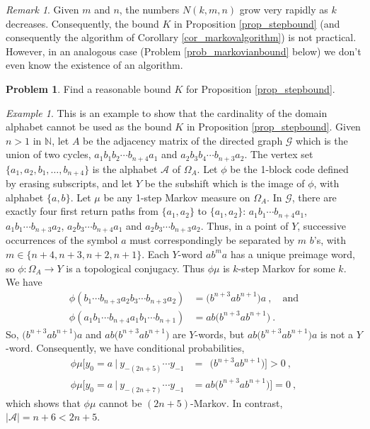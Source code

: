 \documentclass{kepart2010}
\theoremstyle{plain}
\theoremstyle{definition}
\newtheorem{prob}[thm]{Problem}
\theoremstyle{remark}
\newtheorem{rem}[thm]{Remark}        \newtheorem{ex}[thm]{Example}
\theoremstyle{definition}
\numberwithin{equation}{section}
\begin{document}
\begin{rem} Given $m$ and $n$, the numbers $N(k,m,n)$
grow very  rapidly as $k$ decreases.
Consequently, the
 bound $K$ in Proposition \ref{prop_stepbound}
 (and
consequently the algorithm of
Corollary \ref{cor_markovalgorithm}) is not practical.
However, in an analogous case (Problem
\ref{prob_markovianbound} below) we don't even know
the existence of an algorithm.
\end{rem}

\begin{prob}\label{prob_Kbound}
Find a reasonable bound $K$ for Proposition \ref{prop_stepbound}.
\end{prob}
{}{
\begin{ex} This is an example to show that the cardinality
of the domain alphabet cannot be used as the bound $K$ in
Proposition \ref{prop_stepbound}. Given $n>1$ in $\mathbb N$, let
$A$ be the adjacency matrix of the directed graph $\mathcal G$ which
is the union of two cycles, $a_1b_1b_2\cdots b_{n+4}a_1$ and
$a_2b_3b_4\cdots b_{n+3}a_2$. The vertex set $\{a_1,a_2,b_1,\dots
,b_{n+4}\}$ is the alphabet $\mathcal A$ of $\Omega_A$. Let $\phi$
be the 1-block code defined by erasing subscripts, and let $Y$ be
the subshift which is the image of $\phi$, with alphabet $\{a,b\}$.
Let $\mu$ be any 1-step Markov measure on $\Omega_A$. In $\mathcal
G$, there are exactly four first return paths from $\{a_1,a_2\}$ to
$\{a_1,a_2\}$: $a_1b_1\cdots b_{n+4}a_1$, $a_1b_1\cdots b_{n+3}a_2$,
$a_2b_3\cdots b_{n+4}a_1$ and $a_2b_3\cdots b_{n+3}a_2$. Thus, in a
point of $Y$, successive occurrences of the symbol $a$ must
correspondingly be separated by $m$ $b$'s, with $m\in \{ n+4, n+3,
n+2, n+1 \}$. Each $Y$-word $ab^ma$ has a unique preimage word, so
$\phi : \Omega_A \to Y$ is a topological conjugacy. Thus $\phi \mu$
is $k$-step Markov for some $k$. We have
\begin{align*}
\phi (b_1\cdots b_{n+3}a_2b_3\cdots b_{n+3}a_2)
&= \big( b^{n+3}ab^{n+1}\big) a \ , \quad \text{and} \\
 \phi (a_1b_1\cdots b_{n+4}a_1b_1\cdots b_{n+1})
&= ab\big( b^{n+3}ab^{n+1}\big)   \ .
\end{align*}
So, $\big( b^{n+3}ab^{n+1}\big)a$ and $ab\big(b^{n+3}ab^{n+1}\big)$
are $Y$-words, but $ab\big( b^{n+3}ab^{n+1}\big) a$ is not a
$Y$-word. Consequently, we have conditional probabilities,
\begin{align*}
\phi \mu [y_0 =a\ |\ y_{-(2n+5)}\cdots y_{-1}
&= \ \ \big(b^{n+3}ab^{n+1}\big)] > 0 \ , \\
\phi \mu [y_0 =a\ |\ y_{-(2n+7)}\cdots y_{-1} &=
ab\big(b^{n+3}ab^{n+1}\big)] = 0 \ ,
\end{align*}
which shows that $\phi \mu$ cannot be $(2n+5)$-Markov. In contrast,
$|\mathcal A| = n+6 < 2n +5 $.
\end{ex}
}
\end{document}

